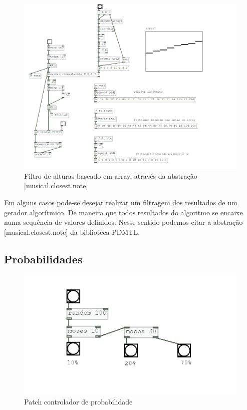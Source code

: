 \documentclass{ppgmus}
\begin{document}
\begin{figure}
\includegraphics[scale=.6]{filtro-alturas}
\caption{Filtro de alturas baseado em array, através da abstração [musical.closest.note]}
\label{filtro-alturas}
\end{figure}  

Em alguns casos pode-se desejar realizar um filtragem
dos resultados de um gerador algorítmico. De maneira que
todos resultados do algoritmo se encaixe numa sequência
de valores definidos. Nesse sentido podemos citar a abstração
[musical.closest.note] da biblioteca PDMTL.




\subsection{Probabilidades}

\begin{figure}
\includegraphics[scale=.6]{probabilidade-simples}
\caption{Patch controlador de probabilidade}
\label{prob-simples}
\end{figure}  
\end{document}
